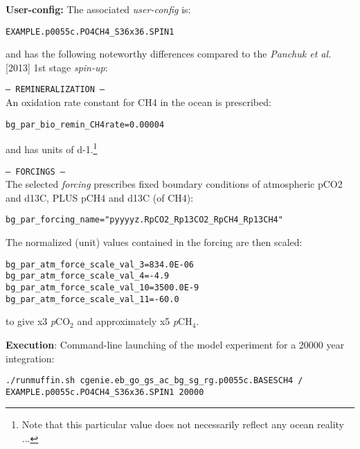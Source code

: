 \documentclass[10pt,twoside]{article}
\begin{document}
\noindent \textbf{User-config:} The associated \textit{user-config} is:
\vspace{-10pt}\begin{verbatim}EXAMPLE.p0055c.PO4CH4_S36x36.SPIN1\end{verbatim}\vspace{-10pt}
and has the following noteworthy differences compared to the \textit{Panchuk et al.} [2013] 1st stage \textit{spin-up}:
\begin{compactitem}
        \item \texttt{--- REMINERALIZATION ---}
        \\ An oxidation rate constant for CH4 in the ocean is prescribed:
\vspace{-5pt}\begin{verbatim}bg_par_bio_remin_CH4rate=0.00004\end{verbatim}\vspace{-5pt}
and has units of d-1.\footnote{Note that this particular value does not necessarily reflect any ocean reality ...}
                \item \texttt{--- FORCINGS ---}
        \\ The selected \textit{forcing} prescribes fixed boundary conditions of atmospheric pCO2 and d13C, PLUS pCH4 and d13C (of CH4):
\vspace{-5pt}\begin{verbatim}bg_par_forcing_name="pyyyyz.RpCO2_Rp13CO2_RpCH4_Rp13CH4"\end{verbatim}\vspace{-5pt}
        The normalized (unit) values contained in the forcing are then scaled:
        \vspace{-5pt}\begin{verbatim}
bg_par_atm_force_scale_val_3=834.0E-06
bg_par_atm_force_scale_val_4=-4.9
bg_par_atm_force_scale_val_10=3500.0E-9
bg_par_atm_force_scale_val_11=-60.0
                \end{verbatim}\vspace{-5pt}
to give x3 \textit{p}CO$_{2}$ and approximately x5 \textit{p}CH$_{4}$.
        \end{compactitem}

\noindent \textbf{Execution}: Command-line launching of the model experiment for a 20000 year integration:
\vspace{-5pt}\begin{verbatim}./runmuffin.sh cgenie.eb_go_gs_ac_bg_sg_rg.p0055c.BASESCH4 /
EXAMPLE.p0055c.PO4CH4_S36x36.SPIN1 20000\end{verbatim}
\end{document}
